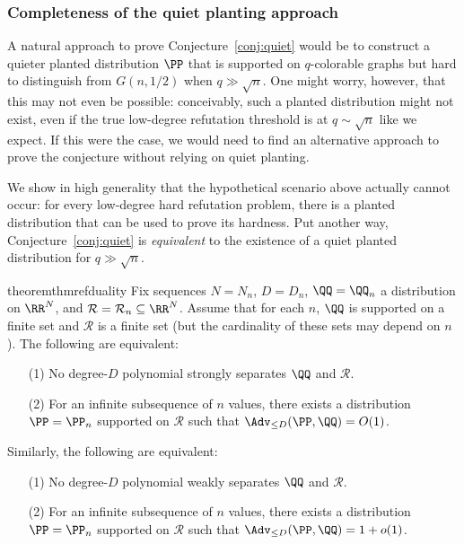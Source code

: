 \documentclass{article}
\begin{document}
\subsubsection{Completeness of the quiet planting approach}

A natural approach to prove Conjecture~\ref{conj:quiet} would be to construct a quieter planted distribution $\PP$ that is supported on $q$-colorable graphs but hard to distinguish from $G(n,1/2)$ when $q \gg \sqrt{n}$. One might worry, however, that this may not even be possible: conceivably, such a planted distribution might not exist, even if the true low-degree refutation threshold is at $q \sim \sqrt{n}$ like we expect. If this were the case, we would need to find an alternative approach to prove the conjecture without relying on quiet planting.

We show in high generality that the hypothetical scenario above actually cannot occur: for every low-degree hard refutation problem, there is a planted distribution that can be used to prove its hardness. Put another way, Conjecture~\ref{conj:quiet} is \emph{equivalent} to the existence of a quiet planted distribution for $q \gg \sqrt{n}$.

\begin{restatable}{theorem}{thmrefduality}
Fix sequences $N = N_n$, $D = D_n$, $\QQ = \QQ_n$ a distribution on $\RR^N$, and $\mathcal{R} = \mathcal{R}_n \subseteq \RR^N$. Assume that for each $n$, $\QQ$ is supported on a finite set and $\mathcal{R}$ is a finite set (but the cardinality of these sets may depend on $n$).
The following are equivalent:
\begin{itemize}
\item[(1)] No degree-$D$ polynomial strongly separates $\QQ$ and $\mathcal{R}$.
\item[(2)] For an infinite subsequence of $n$ values, there exists a distribution $\PP = \PP_n$ supported on $\mathcal{R}$ such that $\Adv_{\le D}(\PP,\QQ) = O(1)$.
\end{itemize}
Similarly, the following are equivalent:
\begin{itemize}
\item[(1)] No degree-$D$ polynomial weakly separates $\QQ$ and $\mathcal{R}$.
\item[(2)] For an infinite subsequence of $n$ values, there exists a distribution $\PP = \PP_n$ supported on $\mathcal{R}$ such that $\Adv_{\le D}(\PP,\QQ) = 1+o(1)$.
\end{itemize}
\end{restatable}
\end{document}
